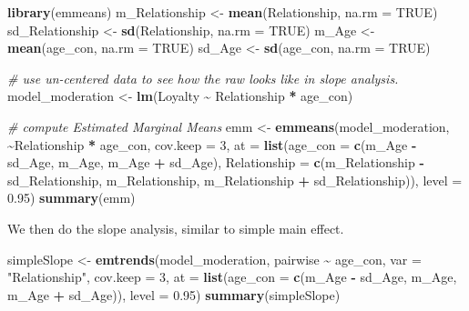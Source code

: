 \documentclass[
]{ctexart}
\newenvironment{Shaded}{\begin{snugshade}}{\end{snugshade}}
\newcommand{\AttributeTok}[1]{\textcolor[rgb]{0.13,0.29,0.53}{#1}}
\newcommand{\CommentTok}[1]{\textcolor[rgb]{0.56,0.35,0.01}{\textit{#1}}}
\newcommand{\ConstantTok}[1]{\textcolor[rgb]{0.56,0.35,0.01}{#1}}
\newcommand{\DecValTok}[1]{\textcolor[rgb]{0.00,0.00,0.81}{#1}}
\newcommand{\FloatTok}[1]{\textcolor[rgb]{0.00,0.00,0.81}{#1}}
\newcommand{\FunctionTok}[1]{\textcolor[rgb]{0.13,0.29,0.53}{\textbf{#1}}}
\newcommand{\NormalTok}[1]{#1}
\newcommand{\OtherTok}[1]{\textcolor[rgb]{0.56,0.35,0.01}{#1}}
\newcommand{\SpecialCharTok}[1]{\textcolor[rgb]{0.81,0.36,0.00}{\textbf{#1}}}
\newcommand{\StringTok}[1]{\textcolor[rgb]{0.31,0.60,0.02}{#1}}
\begin{document}
\begin{Shaded}
\begin{Highlighting}[]
\FunctionTok{library}\NormalTok{(emmeans)}
\NormalTok{m\_Relationship }\OtherTok{\textless{}{-}} \FunctionTok{mean}\NormalTok{(Relationship, }\AttributeTok{na.rm =} \ConstantTok{TRUE}\NormalTok{)}
\NormalTok{sd\_Relationship }\OtherTok{\textless{}{-}} \FunctionTok{sd}\NormalTok{(Relationship, }\AttributeTok{na.rm =} \ConstantTok{TRUE}\NormalTok{)}
\NormalTok{m\_Age }\OtherTok{\textless{}{-}} \FunctionTok{mean}\NormalTok{(age\_con, }\AttributeTok{na.rm =} \ConstantTok{TRUE}\NormalTok{)}
\NormalTok{sd\_Age }\OtherTok{\textless{}{-}} \FunctionTok{sd}\NormalTok{(age\_con, }\AttributeTok{na.rm =} \ConstantTok{TRUE}\NormalTok{)}

\CommentTok{\# use un{-}centered data to see how the raw looks like in slope analysis.}
\NormalTok{model\_moderation }\OtherTok{\textless{}{-}} \FunctionTok{lm}\NormalTok{(Loyalty }\SpecialCharTok{\textasciitilde{}}\NormalTok{ Relationship }\SpecialCharTok{*}\NormalTok{ age\_con)}

\CommentTok{\# compute Estimated Marginal Means}
\NormalTok{emm }\OtherTok{\textless{}{-}} \FunctionTok{emmeans}\NormalTok{(model\_moderation, }\SpecialCharTok{\textasciitilde{}}\NormalTok{Relationship }\SpecialCharTok{*}\NormalTok{ age\_con, }\AttributeTok{cov.keep =} \DecValTok{3}\NormalTok{, }\AttributeTok{at =} \FunctionTok{list}\NormalTok{(}\AttributeTok{age\_con =} \FunctionTok{c}\NormalTok{(m\_Age }\SpecialCharTok{{-}}
\NormalTok{    sd\_Age, m\_Age, m\_Age }\SpecialCharTok{+}\NormalTok{ sd\_Age), }\AttributeTok{Relationship =} \FunctionTok{c}\NormalTok{(m\_Relationship }\SpecialCharTok{{-}}\NormalTok{ sd\_Relationship,}
\NormalTok{    m\_Relationship, m\_Relationship }\SpecialCharTok{+}\NormalTok{ sd\_Relationship)), }\AttributeTok{level =} \FloatTok{0.95}\NormalTok{)}
\FunctionTok{summary}\NormalTok{(emm)}
\end{Highlighting}
\end{Shaded}

We then do the slope analysis, similar to simple main effect.

\begin{Shaded}
\begin{Highlighting}[]
\NormalTok{simpleSlope }\OtherTok{\textless{}{-}} \FunctionTok{emtrends}\NormalTok{(model\_moderation, pairwise }\SpecialCharTok{\textasciitilde{}}\NormalTok{ age\_con, }\AttributeTok{var =} \StringTok{"Relationship"}\NormalTok{,}
    \AttributeTok{cov.keep =} \DecValTok{3}\NormalTok{, }\AttributeTok{at =} \FunctionTok{list}\NormalTok{(}\AttributeTok{age\_con =} \FunctionTok{c}\NormalTok{(m\_Age }\SpecialCharTok{{-}}\NormalTok{ sd\_Age, m\_Age, m\_Age }\SpecialCharTok{+}\NormalTok{ sd\_Age)),}
    \AttributeTok{level =} \FloatTok{0.95}\NormalTok{)}
\FunctionTok{summary}\NormalTok{(simpleSlope)}
\end{Highlighting}
\end{Shaded}
\end{document}
